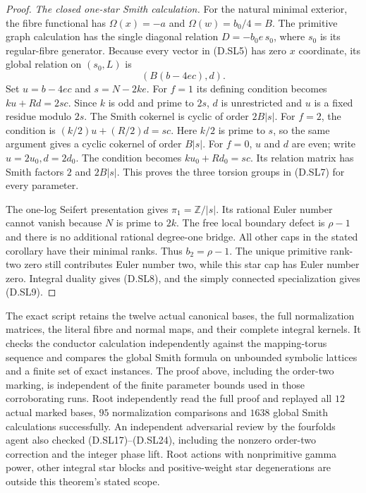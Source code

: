 \begin{proof}
\emph{The closed one-star Smith calculation.}
For the natural minimal exterior, the
fibre functional has
$\Omega(x)=-a$ and $\Omega(w)=b_0/4=B$.
The primitive graph calculation has the
single diagonal relation $D=-b_0e\,s_0$,
where $s_0$ is its regular-fibre generator.
Because every vector in (D.SL5) has zero
$x$ coordinate, its global relation on
$(s_0,L)$ is
\[
                         (B(b-4ec),d).                   \tag{D.SL23}
\]
Set $u=b-4ec$ and $s=N-2ke$.
For $f=1$ its defining condition becomes
$ku+Rd=2sc$. Since $k$ is odd and prime
to $2s$, $d$ is unrestricted and
$u$ is a fixed residue modulo $2s$.
The Smith cokernel is cyclic of order
$2B|s|$.
For $f=2$, the condition is
$(k/2)u+(R/2)d=sc$.
Here $k/2$ is prime to $s$, so the same
argument gives a cyclic cokernel of
order $B|s|$.
For $f=0$, $u$ and $d$ are even; write
$u=2u_0,d=2d_0$. The condition becomes
$ku_0+Rd_0=sc$. Its relation matrix has
Smith factors $2$ and $2B|s|$.
This proves the three torsion groups
in (D.SL7) for every parameter.

The one-log Seifert presentation gives
$\pi_1=\mathbb Z/|s|$. Its rational
Euler number cannot vanish because
$N$ is prime to $2k$. The free local
boundary defect is $\rho-1$ and there
is no additional rational degree-one
bridge. All other caps in the stated
corollary have their minimal ranks.
Thus $b_2=\rho-1$. The unique primitive
rank-two zero still contributes Euler
number two, while this star cap has
Euler number zero. Integral duality
gives (D.SL8), and the simply connected
specialization gives (D.SL9).
\end{proof}

The exact script 
retains the twelve actual canonical bases,
the full normalization matrices, the
literal fibre and normal maps, and their
complete integral kernels. It checks
the conductor calculation independently
against the mapping-torus sequence and
compares the global Smith formula on
unbounded symbolic lattices and a finite
set of exact instances. The proof above,
including the order-two marking, is
independent of the finite parameter
bounds used in those corroborating runs.
Root independently read the full proof and replayed all
$12$ actual marked bases, $95$ normalization comparisons
and $1638$ global Smith calculations successfully.
An independent adversarial review by the fourfolds
agent also checked (D.SL17)--(D.SL24), including the
nonzero order-two correction and the integer phase lift.
Root actions with nonprimitive gamma
power, other integral star blocks and
positive-weight star degenerations are
outside this theorem's stated scope.
